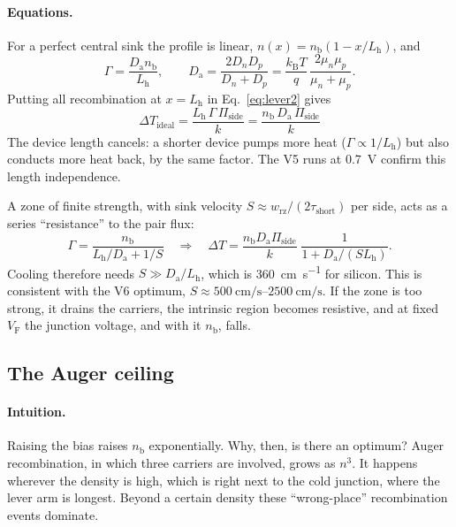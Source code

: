 \documentclass[11pt,a4paper]{article}
\newcommand{\kB}{k_{\mathrm{B}}}
\newcommand{\VF}{V_{\mathrm{F}}}
\newcommand{\Da}{D_{\mathrm{a}}}
\newcommand{\nb}{n_{\mathrm{b}}}
\newcommand{\Pis}{\Pi_{\mathrm{side}}}
\newcommand{\Lh}{L_{\mathrm{h}}}
\begin{document}
\paragraph{Equations.} For a perfect central sink the profile is linear, $n(x)=\nb(1-x/\Lh)$, and
\begin{equation}
  \Gamma = \frac{\Da\nb}{\Lh}, \qquad
  \Da=\frac{2D_nD_p}{D_n+D_p}=\frac{\kB T}{q}\,\frac{2\mu_n\mu_p}{\mu_n+\mu_p}. \label{eq:flux}
\end{equation}
Putting all recombination at $x=\Lh$ in Eq.~\eqref{eq:lever2} gives
\begin{equation}
  \boxed{\;\Delta T_{\mathrm{ideal}} = \frac{\Lh\,\Gamma\,\Pis}{k} = \frac{\nb\,\Da\,\Pis}{k}\;} \label{eq:ideal}
\end{equation}
The device length cancels: a shorter device pumps more heat ($\Gamma\propto1/\Lh$) but also conducts more heat back, by the same factor. The V5 runs at \SI{0.7}{\volt} confirm this length independence.

A zone of finite strength, with sink velocity $S\approx w_{\mathrm{rz}}/(2\tau_{\mathrm{short}})$ per side, acts as a series ``resistance'' to the pair flux:
\begin{equation}
  \Gamma=\frac{\nb}{\Lh/\Da+1/S}\quad\Longrightarrow\quad
  \Delta T = \frac{\nb\Da\Pis}{k}\;\frac{1}{1+\Da/(S\Lh)} . \label{eq:finiteS}
\end{equation}
Cooling therefore needs $S\gg\Da/\Lh$, which is \SI{360}{\centi\metre\per\second} for silicon. This is consistent with the V6 optimum, $S\approx\SIrange{500}{2500}{\centi\metre\per\second}$. If the zone is too strong, it drains the carriers, the intrinsic region becomes resistive, and at fixed $\VF$ the junction voltage, and with it $\nb$, falls.

\subsection{The Auger ceiling}
\paragraph{Intuition.} Raising the bias raises $\nb$ exponentially. Why, then, is there an optimum? Auger recombination, in which three carriers are involved, grows as $n^3$. It happens wherever the density is high, which is right next to the cold junction, where the lever arm is longest. Beyond a certain density these ``wrong-place'' recombination events dominate.
\end{document}
